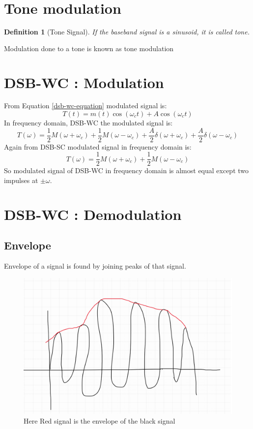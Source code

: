\documentclass{article}
\newtheorem*{definition}{Definition}
\begin{document}
\section{Tone modulation}
\begin{definition}[Tone Signal]
	If the baseband signal is a sinusoid, it is called tone.
\end{definition}
Modulation done to a tone is known as tone modulation

\section{DSB-WC : Modulation}

From Equation \ref{dsb-wc-equation} modulated signal is:
\begin{equation*}
	T(t) = m(t)\cos\left(\omega_ct\right) + A\cos\left(\omega_ct\right)
\end{equation*}
In frequency domain, DSB-WC the modulated signal is:
\begin{equation*}
	T(\omega) = \frac{1}{2}M(\omega+\omega_c) + \frac{1}{2}M(\omega-\omega_c) +
	 \frac{A}{2}\delta(\omega+\omega_c) + \frac{A}{2}\delta(\omega-\omega_c)
\end{equation*}
Again from DSB-SC modulated signal in frequency domain is:
\begin{equation*}
	T(\omega) = \frac{1}{2}M(\omega+\omega_c) + \frac{1}{2}M(\omega-\omega_c) 
\end{equation*}
So modulated signal of DSB-WC in frequency domain is almost equal except two impulses at $\pm \omega$. 

\section{DSB-WC : Demodulation}
\subsection{Envelope}
Envelope of a signal is found by joining peaks of that signal.
\begin{figure}[h!]
	\centering
	\includegraphics[scale=0.5]{images/envelope-hand_drawing.png}
	\caption{Here Red signal is the envelope of the black signal}
\end{figure}
\end{document}

